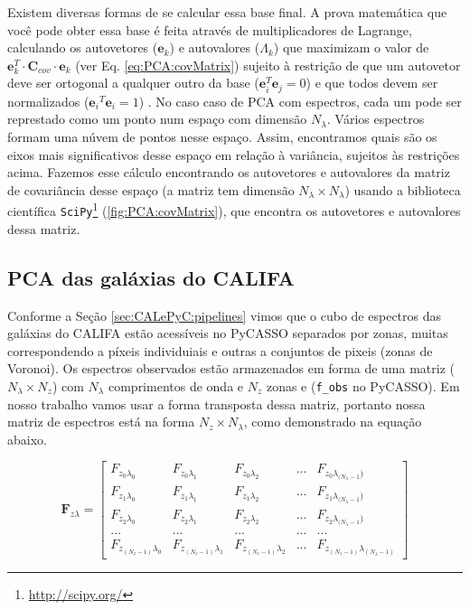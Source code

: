 Existem diversas formas de se calcular essa base final. A prova matemática que você pode obter essa base é feita através
de multiplicadores de Lagrange, calculando os autovetores ($\mathbf{e}{}_k$) e autovalores ($\Lambda_k$) que maximizam o
valor de $\mathbf{e}{}_k^T \cdot \mathbf{C}{}_{cov} \cdot \mathbf{e}{}_k$ (ver Eq. \ref{eq:PCA:covMatrix}) sujeito à
restrição de que um autovetor deve ser ortogonal a qualquer outro da base ($\mathbf{e}{}_i^T \mathbf{e}{}_j = 0$) e que
todos devem ser normalizados ($\mathbf{e}{}_i{}^T \mathbf{e}{}_i = 1$) \citep[][p. 5-6]{JolliffePCA1986}. No caso caso
de PCA com espectros, cada um pode ser represtado como um ponto num espaço com dimensão $N_\lambda$. Vários espectros
formam uma núvem de pontos nesse espaço. Assim, encontramos quais são os eixos mais significativos desse espaço em
relação à variância, sujeitos às restrições acima. Fazemos esse cálculo encontrando os autovetores e autovalores da
matriz de covariância desse espaço (a matriz tem dimensão $N_\lambda \times N_\lambda$) usando a biblioteca científica
\texttt{SciPy}\footnote{\url{http://scipy.org/}} (\ref{fig:PCA:covMatrix}), que encontra os autovetores e autovalores
dessa matriz.

\subsection{PCA das galáxias do CALIFA}

Conforme a Seção \ref{sec:CALePyC:pipelines} vimos que o cubo de espectros das galáxias do CALIFA estão acessíveis no
PyCASSO separados por zonas, muitas correspondendo a píxeis individuiais e outras a conjuntos de pixeis (zonas de
Voronoi). Os espectros observados estão armazenados em forma de uma matriz ($N_\lambda \times N_z$) com $N_\lambda$
comprimentos de onda e $N_z$ zonas e (\texttt{f\_obs} no PyCASSO). Em nosso trabalho vamos usar a forma transposta dessa
matriz, portanto nossa matriz de espectros está na forma $N_z \times N_\lambda$, como demonstrado na equação abaixo.

\begin{equation}
    \label{eq:PCA:fluxMatrix}
    \textbf{F}{}_{z \lambda} = \left[
    \begin{array}{ccccc}
        F_{z_0 \lambda_0} & F_{z_0 \lambda_1} & F_{z_0 \lambda_2} & ... & F_{z_0 \lambda_{(N_\lambda - 1})} \\
        F_{z_1 \lambda_0} & F_{z_1 \lambda_1} & F_{z_1 \lambda_2} & ... & F_{z_1 \lambda_{(N_\lambda - 1})} \\
        F_{z_2 \lambda_0} & F_{z_2 \lambda_1} & F_{z_2 \lambda_2} & ... & F_{z_2 \lambda_{(N_\lambda - 1})} \\
        ...               & ...               & ...               & ... & ...               \\
        F_{z_{(N_z - 1)} \lambda_0} & F_{z_{(N_z - 1)} \lambda_1} & F_{z_{(N_z - 1)} \lambda_2} & ... & F_{z_{(N_z - 1)}
        \lambda_{(N_\lambda - 1)}}
    \end{array} 
    \right]
\end{equation}

